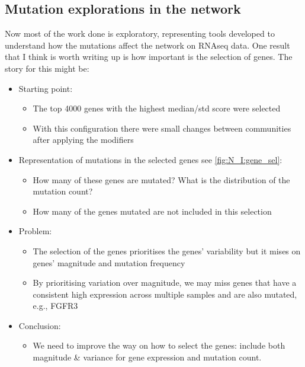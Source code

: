 \subsection{Mutation explorations in the network}

Now most of the work done is exploratory, representing tools developed to understand how the mutations affect the network on RNAseq data. One result that I think is worth writing up is how important is the selection of genes. The story for this might be:
\begin{itemize}
    \item Starting point:
          \begin{itemize}
              \item The top 4000 genes with the highest median/std score were selected
              \item With this configuration there were small changes between communities after applying the modifiers
          \end{itemize}
    \item Representation of mutations in the selected genes see \ref*{fig:N_I:gene_sel}:
          \begin{itemize}
              \item How many of these genes are mutated? What is the distribution of the mutation count?
              \item How many of the genes mutated are not included in this selection
          \end{itemize}
    \item Problem:
          \begin{itemize}
              \item The selection of the genes prioritises the genes' variability but it mises on genes' magnitude and mutation frequency
              \item By prioritising variation over magnitude, we may miss genes that have a consistent high expression across multiple samples and are also mutated, e.g., FGFR3
          \end{itemize}
    \item Conclusion:
          \begin{itemize}
              \item We need to improve the way on how to select the genes: include both magnitude \& variance for gene expression and mutation count.
          \end{itemize}
\end{itemize}

